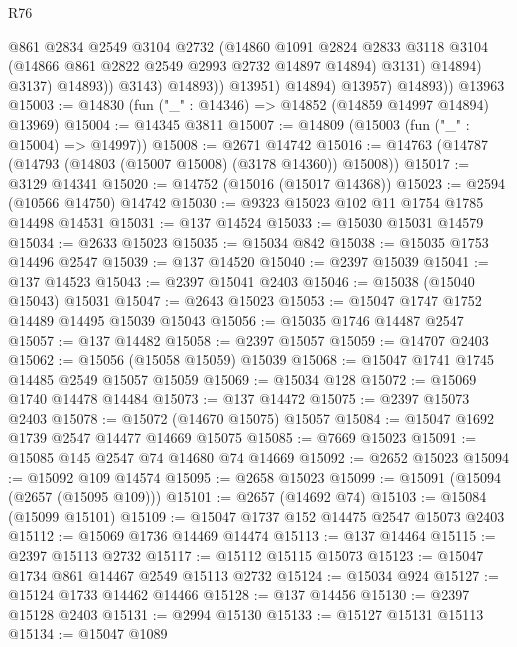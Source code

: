\begin{lexlean}{R76}
\begin{coremodule}
                            @861
                            @2834
                            @2549
                            @3104
                            @2732
                            (@14860
                              @1091
                              @2824
                              @2833
                              @3118
                              @3104
                              (@14866 @861 @2822 @2549 @2993 @2732 @14897 @14894)
                              @3131)
                            @14894)
                          @3137)
                        @14893))
                    @3143)
                  @14893))
              @13951)
            @14894)
          @13957)
        @14893))
    @13963
@15003 := @14830 (fun ("_" : @14346) => @14852 (@14859 @14997 @14894) @13969)
@15004 := @14345 @3811
@15007 := @14809 (@15003 (fun ("_" : @15004) => @14997))
@15008 := @2671 @14742
@15016 := @14763 (@14787 (@14793 (@14803 (@15007 @15008) (@3178 @14360)) @15008))
@15017 := @3129 @14341
@15020 := @14752 (@15016 (@15017 @14368))
@15023 := @2594 (@10566 @14750) @14742
@15030 := @9323 @15023 @102 @11 @1754 @1785 @14498 @14531
@15031 := @137 @14524
@15033 := @15030 @15031 @14579
@15034 := @2633 @15023
@15035 := @15034 @842
@15038 := @15035 @1753 @14496 @2547
@15039 := @137 @14520
@15040 := @2397 @15039
@15041 := @137 @14523
@15043 := @2397 @15041 @2403
@15046 := @15038 (@15040 @15043) @15031
@15047 := @2643 @15023
@15053 := @15047 @1747 @1752 @14489 @14495 @15039 @15043
@15056 := @15035 @1746 @14487 @2547
@15057 := @137 @14482
@15058 := @2397 @15057
@15059 := @14707 @2403
@15062 := @15056 (@15058 @15059) @15039
@15068 := @15047 @1741 @1745 @14485 @2549 @15057 @15059
@15069 := @15034 @128
@15072 := @15069 @1740 @14478 @14484
@15073 := @137 @14472
@15075 := @2397 @15073 @2403
@15078 := @15072 (@14670 @15075) @15057
@15084 := @15047 @1692 @1739 @2547 @14477 @14669 @15075
@15085 := @7669 @15023
@15091 := @15085 @145 @2547 @74 @14680 @74 @14669
@15092 := @2652 @15023
@15094 := @15092 @109 @14574
@15095 := @2658 @15023
@15099 := @15091 (@15094 (@2657 (@15095 @109)))
@15101 := @2657 (@14692 @74)
@15103 := @15084 (@15099 @15101)
@15109 := @15047 @1737 @152 @14475 @2547 @15073 @2403
@15112 := @15069 @1736 @14469 @14474
@15113 := @137 @14464
@15115 := @2397 @15113 @2732
@15117 := @15112 @15115 @15073
@15123 := @15047 @1734 @861 @14467 @2549 @15113 @2732
@15124 := @15034 @924
@15127 := @15124 @1733 @14462 @14466
@15128 := @137 @14456
@15130 := @2397 @15128 @2403
@15131 := @2994 @15130
@15133 := @15127 @15131 @15113
@15134 := @15047 @1089

\end{coremodule}
\end{lexlean}
